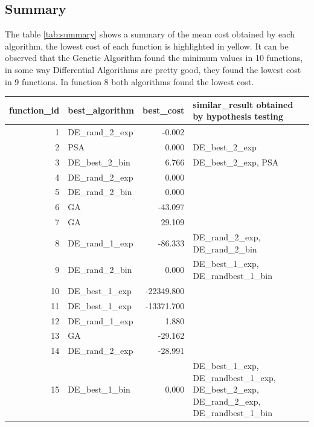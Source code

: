 \documentclass[12pt]{article}
\begin{document}
\begin{landscape}
    \subsection{Summary}
    

The table \ref{tab:summary} shows a summary of the mean cost obtained by each algorithm, the lowest cost of each function is highlighted in yellow. It can be observed that the Genetic Algorithm found the minimum values in 10 functions, in some way Differential Algorithms are pretty good, they found the lowest cost in 9 functions. In function 8 both algorithms found the lowest cost. 




\end{landscape}


\begin{table}[H]
    \centering
    \footnotesize 
\begin{tabular}{rlrp{}}
\toprule
 function\_id & best\_algorithm &  best\_cost &                                                                                                                  similar\_result obtained by hypothesis testing \\
\midrule
 1 &  DE\_rand\_2\_exp & -0.002 &   \\
 2 &  PSA & 0.000 &  DE\_best\_2\_exp \\
 3 &  DE\_best\_2\_bin & 6.766 &  DE\_best\_2\_exp, PSA \\
 4 &  DE\_rand\_2\_exp & 0.000 &   \\
 5 &  DE\_rand\_2\_bin & 0.000 &   \\
 6 &  GA & -43.097 &   \\
 7 &  GA & 29.109 &   \\
 8 &  DE\_rand\_1\_exp & -86.333 &  DE\_rand\_2\_exp, DE\_rand\_2\_bin \\
 9 &  DE\_rand\_2\_bin & 0.000 &  DE\_best\_1\_exp, DE\_randbest\_1\_bin \\
 10 &  DE\_best\_1\_exp & -22349.800 &   \\
 11 &  DE\_best\_1\_exp & -13371.700 &   \\
 12 &  DE\_rand\_1\_exp & 1.880 &   \\
 13 &  GA & -29.162 &   \\
 14 &  DE\_rand\_2\_exp & -28.991 &   \\
 15 &  DE\_best\_1\_bin & 0.000 &  DE\_best\_1\_exp, DE\_randbest\_1\_exp, DE\_best\_2\_exp, DE\_rand\_2\_exp, DE\_randbest\_1\_bin \\

\end{tabular}
\end{table}
\end{document}
